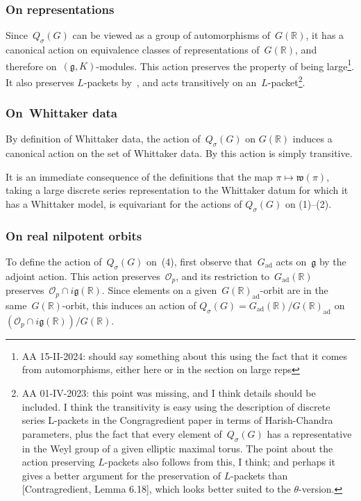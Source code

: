 \documentclass[10pt,leqno]{article}
\newcommand{\Gad}{G_\mathrm{ad}}
\renewcommand{\O}{\mathcal O}
\newcommand{\R}{\mathbb R}
\newcommand{\g}{\mathfrak g}
\newcommand{\w}{\mathfrak w}
\newcommand{\Op}{\O_p}
\begin{document}
\subsubsection*{On representations} 
Since~$Q_\sigma(G)$ can be viewed as a group of automorphisms of~$G(\R)$,  it has a canonical action on equivalence classes of representations of~$G(\R)$, and therefore on~$(\g, K)$-modules. This action preserves  the property of being large\footnote{AA 15-II-2024: should say something about this using the fact that it comes from automorphisms, either here or in the section on large reps}. It also preserves $L$-packets by~\cite[Lemma 6.18]{Contragredient}, and acts transitively on an~$L$-packet\footnote{AA 01-IV-2023: this point was missing, and I think details should be included. I think the transitivity is easy using  the description of discrete series L-packets in the Congragredient paper in terms of Harish-Chandra parameters, plus the fact that every element of~$Q_{\sigma}(G)$ has a representative in the Weyl group of a given elliptic maximal torus. The point about the action preserving $L$-packets also follows from this, I think; and perhaps it gives a better argument for the preservation of $L$-packets than [Contragredient, Lemma 6.18], which looks better suited to the $\theta$-version.}.

\subsubsection*{On~Whittaker data}  By definition of Whittaker data, the action of~$Q_{\sigma}(G)$ on $G(\R)$ induces a canonical action on the set of Whittaker data. By \cite[(14.15)]{abv} this action is simply transitive. 

It is an immediate consequence of the definitions that the map $\pi \mapsto \w(\pi)$, taking a large discrete series representation to the Whittaker datum for which it has a Whittaker model, is equivariant for the actions of $Q_{\sigma}(G)$ on (1)--(2). 


\subsubsection*{On real nilpotent orbits} 

To define the action of~$Q_{\sigma}(G)$ on~(4), first observe that~$\Gad$ acts on~$\g$ by the adjoint action. This action preserves~$\Op$, and its restriction to~$\Gad(\R)$ preserves~$\Op\cap i\g(\R)$. Since elements on a given~$G(\R)_{\mathrm{ad}}$-orbit are in the same~$G(\R)$-orbit, this induces an action of $Q_{\sigma}(G)=\Gad(\R)/G(\R)_{\mathrm{ad}}$ on~$(\Op\cap i\g(\R))/G(\R)$.
\end{document}
